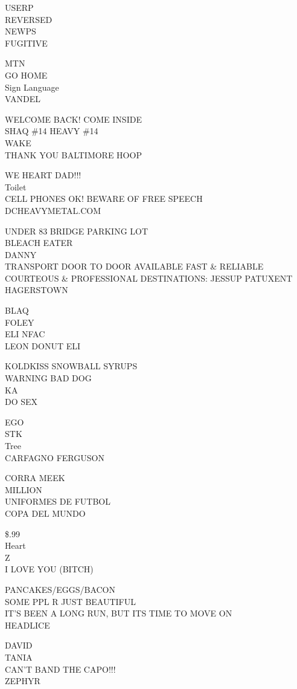 \documentclass[10pt,letterpaper]{article}
\begin{document}
USERP\\
REVERSED\\
NEWPS\\
FUGITIVE

MTN\\
GO HOME\\
Sign Language\\
VANDEL

WELCOME BACK!  COME INSIDE\\
SHAQ \#14 HEAVY \#14\\
WAKE\\
THANK YOU BALTIMORE HOOP

WE HEART DAD!!!\\
Toilet\\
CELL PHONES OK!  BEWARE OF FREE SPEECH\\
DCHEAVYMETAL.COM

UNDER 83 BRIDGE PARKING LOT\\
BLEACH EATER\\
DANNY\\
TRANSPORT DOOR TO DOOR AVAILABLE FAST \& RELIABLE COURTEOUS \& PROFESSIONAL DESTINATIONS: JESSUP PATUXENT HAGERSTOWN

BLAQ\\
FOLEY\\
ELI NFAC\\
LEON DONUT ELI

KOLDKISS SNOWBALL SYRUPS\\
WARNING BAD DOG\\
KA\\
DO SEX

EGO\\
STK\\
Tree\\
CARFAGNO FERGUSON

CORRA MEEK\\
MILLION\\
UNIFORMES DE FUTBOL\\
COPA DEL MUNDO

\$.99\\
Heart\\
Z\\
I LOVE YOU (BITCH)

PANCAKES/EGGS/BACON\\
SOME PPL R JUST BEAUTIFUL\\
IT'S BEEN A LONG RUN, BUT ITS TIME TO MOVE ON\\
HEADLICE

DAVID\\
TANIA\\
CAN'T BAND THE CAPO!!!\\
ZEPHYR
\end{document}
